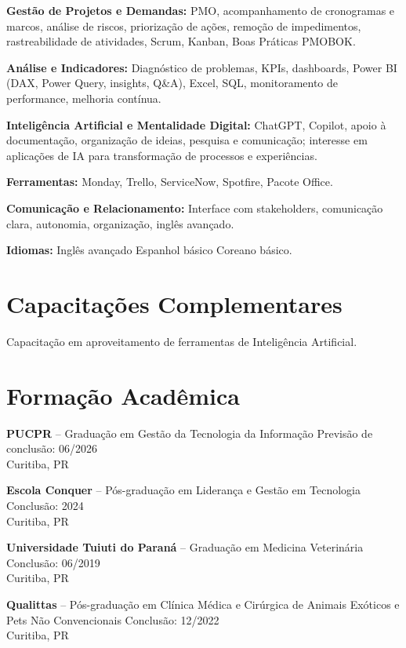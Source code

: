 \documentclass[11pt,a4paper]{article}
\begin{document}
\textbf{Gestão de Projetos e Demandas:} PMO, acompanhamento de cronogramas e marcos, análise de riscos, priorização de ações, remoção de impedimentos, rastreabilidade de atividades, Scrum, Kanban, Boas Práticas PMOBOK.

\textbf{Análise e Indicadores:} Diagnóstico de problemas, KPIs, dashboards, Power BI (DAX, Power Query, insights, Q\&A), Excel, SQL, monitoramento de performance, melhoria contínua.

\textbf{Inteligência Artificial e Mentalidade Digital:} ChatGPT, Copilot, apoio à documentação, organização de ideias, pesquisa e comunicação; interesse em aplicações de IA para transformação de processos e experiências.

\textbf{Ferramentas:} Monday, Trello, ServiceNow, Spotfire, Pacote Office.

\textbf{Comunicação e Relacionamento:} Interface com stakeholders, comunicação clara, autonomia, organização, inglês avançado.

\textbf{Idiomas:} Inglês avançado \textbullet{} Espanhol básico \textbullet{} Coreano básico.

\section*{Capacitações Complementares}

Capacitação em aproveitamento de ferramentas de Inteligência Artificial.

\section*{Formação Acadêmica}

\textbf{PUCPR} -- Graduação em Gestão da Tecnologia da Informação \hfill Previsão de conclusão: 06/2026\\
Curitiba, PR

\textbf{Escola Conquer} -- Pós-graduação em Liderança e Gestão em Tecnologia \hfill Conclusão: 2024\\
Curitiba, PR

\textbf{Universidade Tuiuti do Paraná} -- Graduação em Medicina Veterinária \hfill Conclusão: 06/2019\\
Curitiba, PR

\textbf{Qualittas} -- Pós-graduação em Clínica Médica e Cirúrgica de Animais Exóticos e Pets Não Convencionais \hfill Conclusão: 12/2022\\
Curitiba, PR
\end{document}
